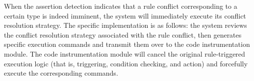 When the assertion detection indicates that a rule conflict corresponding to a certain type is indeed imminent, the system will immediately execute its conflict resolution strategy. The specific implementation is as follows: the system reviews the conflict resolution strategy associated with the rule conflict, then generates specific execution commands and transmit them over to the code instrumentation module. The code instrumentation module will cancel the original rule-triggered execution logic (that is, triggering, condition checking, and action) and forcefully execute the corresponding commands.